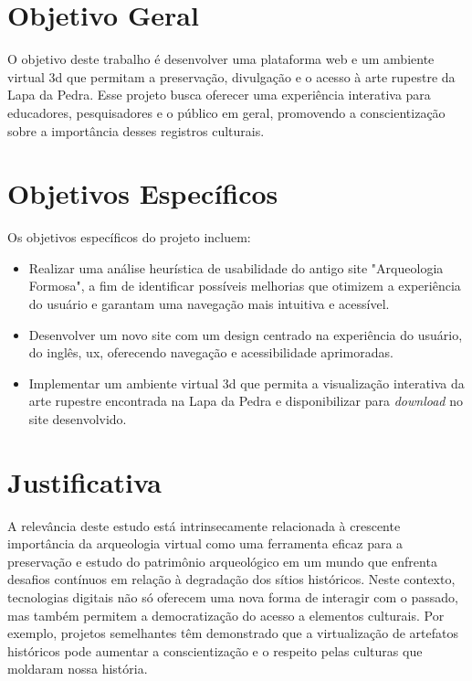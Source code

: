 \section{Objetivo Geral}
O objetivo deste trabalho é desenvolver uma plataforma web e um ambiente virtual \gls{3d} que permitam a preservação, divulgação e o acesso à arte rupestre da Lapa da Pedra. Esse projeto busca oferecer uma experiência interativa para educadores, pesquisadores e o público em geral, promovendo a conscientização sobre a importância desses registros culturais.

\section{Objetivos Específicos}
Os objetivos específicos do projeto incluem:
\begin{itemize}
    \item Realizar uma análise heurística de usabilidade do antigo site "Arqueologia Formosa", a fim de identificar possíveis melhorias que otimizem a experiência do usuário e garantam uma navegação mais intuitiva e acessível.
    \item Desenvolver um novo site com um design centrado na experiência do usuário, do inglês, \gls{ux}, oferecendo navegação e acessibilidade aprimoradas.
    \item Implementar um ambiente virtual \gls{3d} que permita a visualização interativa da arte rupestre encontrada na Lapa da Pedra e disponibilizar para \textit{download} no site desenvolvido.
\end{itemize}


\section{Justificativa}
A relevância deste estudo está intrinsecamente relacionada à crescente importância da arqueologia virtual como uma ferramenta eficaz para a preservação e estudo do patrimônio arqueológico em um mundo que enfrenta desafios contínuos em relação à degradação dos sítios históricos. Neste contexto, tecnologias digitais não só oferecem uma nova forma de interagir com o passado, mas também permitem a democratização do acesso a elementos culturais. Por exemplo, projetos semelhantes têm demonstrado que a virtualização de artefatos históricos pode aumentar a conscientização e o respeito pelas culturas que moldaram nossa história.

